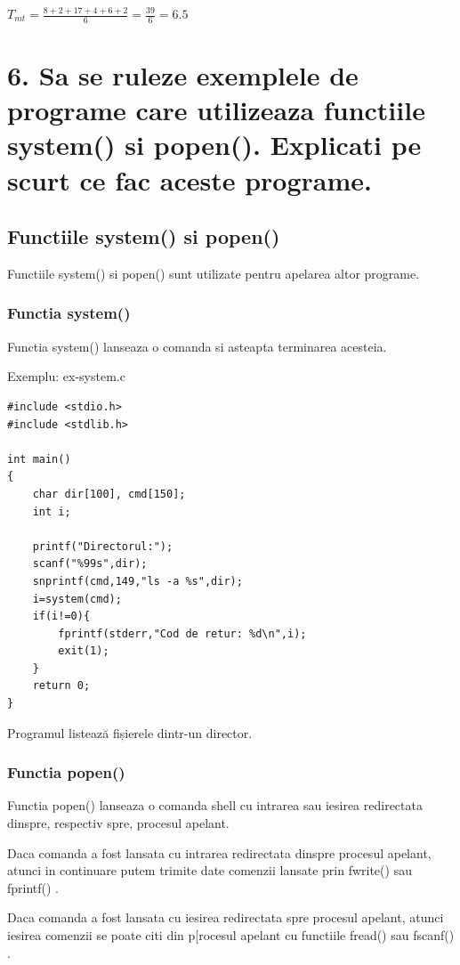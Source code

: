 \documentclass[11pt]{article}
\begin{document}
\(T_{mt} = \frac{8 + 2 + 17 + 4 + 6 + 2}{6} = \frac{39}{6} = 6.5\)
\section{6. Sa se ruleze exemplele de programe care utilizeaza functiile system() si popen(). Explicati pe scurt ce fac aceste programe.}
\label{sec:orgcd32958}

\subsection{Functiile system() si popen()}
\label{sec:orga0e3503}
Functiile system() si popen() sunt utilizate pentru apelarea altor programe.
\subsubsection{Functia system()}
\label{sec:org601217f}
Functia system() lanseaza o comanda si asteapta terminarea acesteia.

Exemplu: ex-system.c
\begin{verbatim}
#include <stdio.h>
#include <stdlib.h>

int main()
{
    char dir[100], cmd[150];
    int i;
    
    printf("Directorul:");
    scanf("%99s",dir);
    snprintf(cmd,149,"ls -a %s",dir);
    i=system(cmd);
    if(i!=0){
        fprintf(stderr,"Cod de retur: %d\n",i);
        exit(1);
    }
    return 0;
}
\end{verbatim}

Programul listează fișierele dintr-un director.
\subsubsection{Functia popen()}
\label{sec:org26457c0}
Functia popen() lanseaza o comanda shell cu intrarea sau iesirea redirectata dinspre, respectiv spre, procesul apelant.

Daca comanda a fost lansata cu intrarea redirectata dinspre procesul apelant, atunci in continuare putem trimite date comenzii lansate prin fwrite() sau fprintf() .

Daca comanda a fost lansata cu iesirea redirectata spre procesul apelant, atunci iesirea comenzii se poate citi din p[rocesul apelant cu functiile fread() sau fscanf() .
\end{document}
